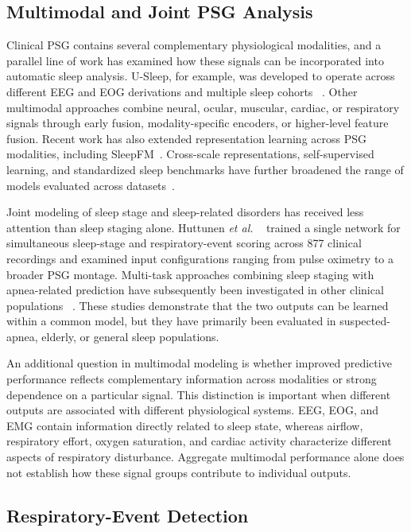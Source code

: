 \documentclass[a4paper,fleqn]{cas-sc}
\begin{document}
\subsection{Multimodal and Joint PSG Analysis}

Clinical PSG contains several complementary physiological modalities, and a
parallel line of work has examined how these signals can be incorporated into
automatic sleep analysis. U-Sleep, for example, was developed to operate across
different EEG and EOG derivations and multiple sleep cohorts
~\cite{perslev2021usleep}. Other multimodal approaches combine neural, ocular,
muscular, cardiac, or respiratory signals through early fusion,
modality-specific encoders, or higher-level feature fusion. Recent work has also extended representation learning across PSG modalities, including SleepFM~\cite{sleepfm2026}. Cross-scale representations, self-supervised learning, and standardized sleep benchmarks have further broadened the range of models evaluated across datasets~\cite{csbrain2025,sleepyland2026,estevan2025ssl}.

Joint modeling of sleep stage and sleep-related disorders has received less
attention than sleep staging alone. Huttunen \emph{et al.}
~\cite{huttunen2023simultaneous} trained a single network for simultaneous
sleep-stage and respiratory-event scoring across 877 clinical recordings and
examined input configurations ranging from pulse oximetry to a broader PSG
montage. Multi-task approaches combining sleep staging with apnea-related
prediction have subsequently been investigated in other clinical populations
~\cite{multitask2025elderly}. These studies demonstrate that the two outputs can
be learned within a common model, but they have primarily been evaluated in
suspected-apnea, elderly, or general sleep populations.

An additional question in multimodal modeling is whether improved predictive
performance reflects complementary information across modalities or strong
dependence on a particular signal. This distinction is important when different
outputs are associated with different physiological systems. EEG, EOG, and EMG
contain information directly related to sleep state, whereas airflow,
respiratory effort, oxygen saturation, and cardiac activity characterize
different aspects of respiratory disturbance. Aggregate multimodal performance
alone does not establish how these signal groups contribute to individual
outputs.

\subsection{Respiratory-Event Detection}
\end{document}
